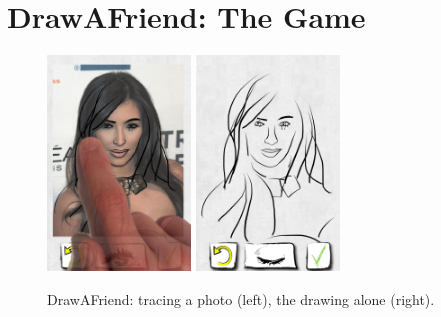 \section{DrawAFriend: The Game}

\begin{figure}
  \centering%
\includegraphics[width=1.5in]{DaF/kim_finger.pdf}
\hspace{0.1in}
\includegraphics[width=1.5in]{DaF/kim_hidden.png}
  \caption{DrawAFriend: tracing a photo (left), the drawing alone (right).}
  \label{fig:DaF}
\end{figure}

